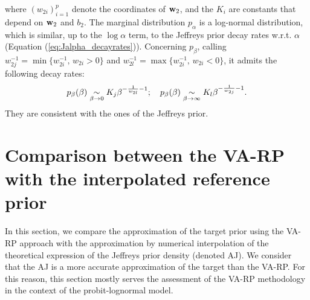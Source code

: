 where $(w_{2i})_{i=1}^p$ denote the coordinates of $\mathbf{w}_2$, and the $K_i$ are constants that depend on $\mathbf{w}_2$ and $b_2$. 
The marginal distribution $p_\alpha$ is a log-normal distribution, which is similar, up to the $\log \alpha$ term, to the Jeffreys prior decay rates w.r.t. $\alpha$ (Equation (\ref{eq:Jalpha_decayrates})).  Concerning $p_\beta$, calling $w_{2j}^{-1}=\min\{w_{2i}^{-1},\,w_{2i}>0\}$ and $w_{2l}^{-1}=\max\{w_{2i}^{-1},\,w_{2i}<0\}$, 
it admits the following decay rates:
\begin{equation}
    p_\beta(\beta)\underset{\beta\rightarrow0}{\sim} K_j\beta^{-\frac{1}{w_{2l}}-1};\quad p_\beta(\beta)\underset{\beta\rightarrow\infty}{\sim} K_l\beta^{-\frac{1}{w_{2j}}-1}.
    \label{eq:palphabeta}
\end{equation}
They are consistent with the ones of the Jeffreys prior. %























\section{Comparison between the VA-RP with the interpolated reference prior}



In this section, we compare the approximation of the target prior using the VA-RP approach with the approximation by numerical interpolation of the theoretical expression of the Jeffreys prior density (denoted AJ).
We consider that the AJ is a more accurate approximation of the target than the VA-RP. For this reason, this section mostly serves the assessment of the VA-RP methodology in the context of the probit-lognormal model.


